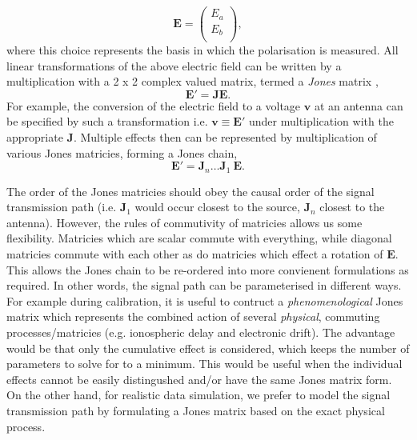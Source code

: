 \begin{equation*}
\bm{E} = \left(
\begin{array}{c}
E_a \\
E_b \\
\end{array} \right),
\end{equation*}
\noindent where this choice represents the basis in which the polarisation is measured. All linear transformations of the above electric field can be written by a multiplication with a 2 x 2 complex valued matrix, termed a \emph{Jones} matrix \citep{Jones_1941},
\begin{equation}
\bm{E'} = \bm{J E}.
\end{equation}
For example, the conversion of the electric field to a voltage $\bm{v}$ at an antenna can be specified by such a transformation i.e. $\bm{v} \equiv \bm{E'}$ under multiplication with the appropriate $\bm{J}$. Multiple effects then can be represented by multiplication of various Jones matricies, forming a Jones chain,
\begin{equation}
\bm{E'} = \bm{J}_n \ldots \bm{J}_1\ \bm{E}.
\end{equation}

The order of the Jones matricies should obey the causal order of the signal transmission path (i.e. $\bm{J}_1$ would occur closest to the source, $\bm{J}_n$ closest to the antenna). However, the rules of commutivity of matricies allows us some flexibility. Matricies which are scalar commute with everything, while diagonal matricies commute with each other as do matricies which effect a rotation of $\bm{E}$. This allows the Jones chain to be re-ordered into more convienent formulations as required. In other words, the signal path can be parameterised in different ways. For example during calibration, it is useful to contruct a \emph{phenomenological} Jones matrix which represents the combined action of several \emph{physical}, commuting processes/matricies (e.g. ionospheric delay and electronic drift). The advantage would be that only the cumulative effect is considered, which keeps the number of parameters to solve for to a minimum. This would be useful when the individual effects cannot be easily distingushed and/or have the same Jones matrix form. On the other hand, for realistic data simulation, we prefer to model the signal transmission path by formulating a Jones matrix based on the exact physical process.


